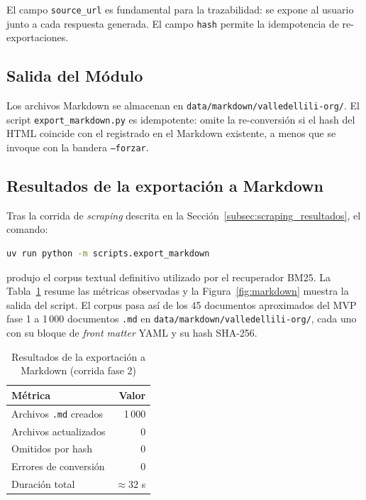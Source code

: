 \documentclass[conference]{IEEEtran}
\newcommand{\code}[1]{\texttt{\small #1}}
\begin{document}
El campo \code{source\_url} es fundamental para la trazabilidad: se expone
al usuario junto a cada respuesta generada. El campo \code{hash} permite la
idempotencia de re-exportaciones.

\subsection{Salida del Módulo}

Los archivos Markdown se almacenan en
\code{data/markdown/valledellili-org/}. El script \code{export\_markdown.py}
es idempotente: omite la re-conversión si el hash del HTML coincide con el
registrado en el Markdown existente, a menos que se invoque con la bandera
\code{--forzar}.

\subsection{Resultados de la exportación a Markdown}
\label{subsec:markdown_resultados}

Tras la corrida de \textit{scraping} descrita en la
Sección~\ref{subsec:scraping_resultados}, el comando:

\begin{lstlisting}[language=bash, caption={Comando de exportación del
corpus crudo a Markdown}, label={lst:export_cmd}]
uv run python -m scripts.export_markdown
\end{lstlisting}

produjo el corpus textual definitivo utilizado por el recuperador BM25.
La Tabla~\ref{tab:markdown_resultados} resume las métricas observadas y la
Figura~\ref{fig:markdown} muestra la salida del script. El corpus pasa así
de los 45 documentos aproximados del MVP fase 1 a 1\,000 documentos
\code{.md} en \code{data/markdown/valledellili-org/}, cada uno con su
bloque de \textit{front matter} YAML y su hash SHA-256.

\begin{table}[ht]
\centering
\caption{Resultados de la exportación a Markdown (corrida fase 2)}
\label{tab:markdown_resultados}
\setlength{\tabcolsep}{4pt}
\begin{tabular}{@{}lr@{}}
\toprule
\textbf{Métrica} & \textbf{Valor} \\
\midrule
Archivos \code{.md} creados   & 1\,000 \\
Archivos actualizados         & 0      \\
Omitidos por hash             & 0      \\
Errores de conversión         & 0      \\
Duración total                & $\approx 32$ s \\
\bottomrule
\end{tabular}
\end{table}
\end{document}
